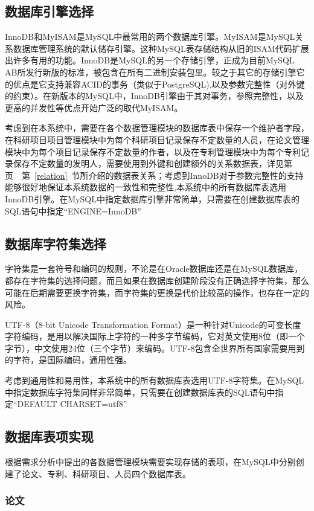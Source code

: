 \subsection{数据库引擎选择}

InnoDB和MyISAM是MySQL中最常用的两个数据库引擎。MyISAM是MySQL关系数据库管理系统的默认储存引擎。这种MySQL表存储结构从旧的ISAM代码扩展出许多有用的功能。InnoDB是MySQL的另一个存储引擎，正成为目前MySQL AB所发行新版的标准，被包含在所有二进制安装包里。较之于其它的存储引擎它的优点是它支持兼容ACID的事务（类似于PostgreSQL),以及参数完整性（对外键的约束）。在新版本的MySQL中，InnoDB引擎由于其对事务，参照完整性，以及更高的并发性等优点开始广泛的取代MyISAM。

考虑到在本系统中，需要在各个数据管理模块的数据库表中保存一个维护者字段，在科研项目项目管理模块中为每个科研项目记录保存不定数量的人员，在论文管理模块中为每个项目记录保存不定数量的作者，以及在专利管理模块中为每个专利记录保存不定数量的发明人，需要使用到外键和创建额外的关系数据表，详见第页~\pageref{relation}~第~\ref{relation}~节所介绍的数据表关系；考虑到InnoDB对于参数完整性的支持能够很好地保证本系统数据的一致性和完整性,本系统中的所有数据库表选用InnoDB引擎。在MySQL中指定数据库引擎非常简单，只需要在创建数据库表的SQL语句中指定“ENGINE=InnoDB”

\subsection{数据库字符集选择}
\label{utf8}
字符集是一套符号和编码的规则，不论是在Oracle数据库还是在MySQL数据库，都存在字符集的选择问题，而且如果在数据库创建阶段没有正确选择字符集，那么可能在后期需要更换字符集，而字符集的更换是代价比较高的操作，也存在一定的风险。

UTF-8（8-bit Unicode Transformation Format）是一种针对Unicode的可变长度字符编码，是用以解决国际上字符的一种多字节编码，它对英文使用8位（即一个字节），中文使用24位（三个字节）来编码。UTF-8包含全世界所有国家需要用到的字符，是国际编码，通用性强。

考虑到通用性和易用性，本系统中的所有数据库表选用UTF-8字符集。在MySQL中指定数据库字符集同样非常简单，只需要在创建数据库表的SQL语句中指定“DEFAULT CHARSET=utf8”


\subsection{数据库表项实现}
根据需求分析中提出的各数据管理模块需要实现存储的表项，在MySQL中分别创建了论文、专利、科研项目、人员四个数据库表。

\subsubsection{论文}

